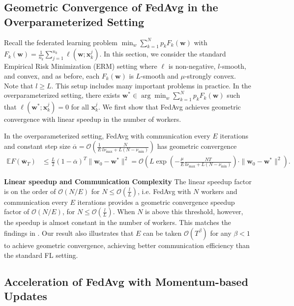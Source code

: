 \subsection{Geometric Convergence of FedAvg in the Overparameterized Setting}
Recall the federated learning problem $\min_{w}\sum_{k=1}^{N}p_{k}F_{k}(\mathbf{w})$
with $F_{k}(\mathbf{w})=\frac{1}{n_{k}}\sum_{j=1}^{n_{k}}\ell(\mathbf{w};\mathbf{x}_{k}^{j})$.
In this section, we consider the standard Empirical Risk Minimization (ERM) setting where $\ell$
is non-negative, $l$-smooth, and convex, and as before, each $F_{k}(\mathbf{w})$ is $L$-smooth and $\mu$-strongly convex. Note that $l\geq L$. This
setup includes many important problems in practice. In the overparameterized
setting, there exists $\mathbf{w}^{\ast}\in\arg\min_{w}\sum_{k=1}^{N}p_{k}F_{k}(\mathbf{w})$
such that $\ell(\mathbf{w}^{\ast};\mathbf{x}_{k}^{j})=0$ for all
$\mathbf{x}_{k}^{j}$. We first show that FedAvg achieves geometric convergence
with linear speedup in the number of workers. 
\begin{theorem}
	\label{thm:overparameterized_general}In the overparameterized setting,
	FedAvg with communication every $E$ iterations
	and constant step size $\overline{\alpha}=\mathcal{O}(\frac{1}{E}\frac{N}{l\nu_{\max}+L(N-\nu_{\min})})$
	has geometric convergence
	\begin{align*}
	\mathbb{E}F(\overline{\mathbf{w}}_{T}) & \leq\frac{L}{2}(1-\overline{\alpha})^{T}\|\mathbf{w}_{0}-\mathbf{w}^{\ast}\|^{2}=\mathcal{O}\left(L\exp(-\frac{\mu}{E}\frac{NT}{l\nu_{\max}+L(N-\nu_{\min})})\cdot\|\mathbf{w}_{0}-\mathbf{w}^{\ast}\|^{2}\right).
	\end{align*}
\end{theorem}
%
\textbf{Linear speedup and Communication Complexity} The linear speedup factor is on the order of $\mathcal{O}(N/E)$ %
for $N\leq\mathcal{O}(\frac{l}{L})$, i.e. FedAvg with $N$ workers and communication
every $E$ iterations provides a geometric convergence speedup factor
of $\mathcal{O}(N/E)$, for $N\leq\mathcal{O}(\frac{l}{L})$. When $N$ is above
this threshold, however, the speedup is almost constant in the number
of workers. This matches the findings in \cite{ma2017power}. Our
result also illustrates that $E$ can be taken $\mathcal{O}(T^{\beta})$
for any $\beta<1$ to achieve geometric convergence, achieving better communication efficiency than
the standard FL setting. 

\subsection{Acceleration of FedAvg with Momentum-based Updates}

